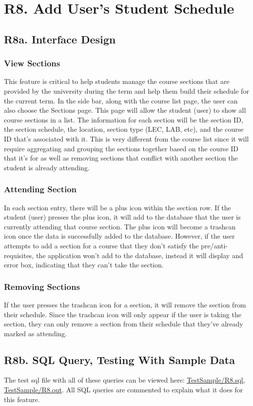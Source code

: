 \documentclass[12pt, a4paper]{article}
\begin{document}
\section*{R8. Add User's Student Schedule}
\label{sec:R8}
\subsection*{R8a. Interface Design}
\subsubsection*{View Sections}
This feature is critical to help students manage the course sections that are provided by the university during the term and help them build their schedule for the current term. In the side bar, along with the course list page, the user can also choose the Sections page. This page will allow the student (user) to show all course sections in a list. The information for each section will be the section ID, the section schedule, the location, section type (LEC, LAB, etc), and the course ID that's associated with it. This is very different from the course list since it will require aggregating and grouping the sections together based on the course ID that it's for as well as removing sections that conflict with another section the student is already attending.
\subsubsection*{Attending Section}
In each section entry, there will be a plus icon within the section row. If the student (user) presses the plus icon, it will add to the database that the user is currently attending that course section. The plus icon will become a trashcan icon once the data is successfully added to the database. However, if the user attempts to add a section for a course that they don't satisfy the pre/anti-requisites, the application won't add to the database, instead it will display and error box, indicating that they can't take the section.
\subsubsection*{Removing Sections}
If the user presses the trashcan icon for a section, it will remove the section from their schedule. Since the trashcan icon will only appear if the user is taking the section, they can only remove a section from their schedule that they've already marked as attending.
\subsection*{R8b. SQL Query, Testing With Sample Data}
The test sql file with all of these queries can be viewed here: \underline{\href{https://github.com/Kggupta/DegreeMap/tree/main/Database/Queries/TestSample}{TestSample/R8.sql}}, \underline{\href{https://github.com/Kggupta/DegreeMap/tree/main/Database/Queries/TestSample}{TestSample/R8.out}}. All SQL queries are commented to explain what it does for this feature.
\end{document}
